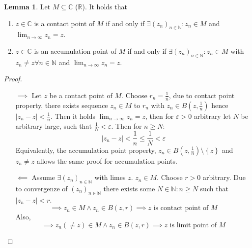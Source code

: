\documentclass[a4paper,landscape,twocolumn]{article}
\theoremstyle{definition}
\newtheorem{lemma}{Lemma}
\newcommand\set[1]{\left\{#1\right\}}
\newcommand\abs[1]{\left|#1\right|}
\newcommand\seq[1]{{\left(#1\right)}_{n \in \mathbb N}}
\begin{document}
\begin{lemma}
  \label{characterization-limit-contact-points}
  Let $M \subseteq \mathbb C$ ($\mathbb R$). It holds that
  \begin{enumerate}
    \item $z \in \mathbb C$ is a contact point of $M$
      if and only if $\exists (z_n)_{n \in \mathbb N}: z_n \in M$ and $\lim_{n\to\infty} z_n = z$.
    \item $z \in \mathbb C$ is an accumulation point of $M$
      if and only if $\exists (z_n)_{n \in \mathbb N}: z_n \in M$ with $z_n \neq z \forall n \in \mathbb N$
      and $\lim_{n\to\infty} z_n = z$.
  \end{enumerate}

\end{lemma}
\begin{proof}
  \begin{itemize}
    \item[$\implies$]
      Let $z$ be a contact point of $M$. Choose $r_n = \frac1n$, due to contact point property,
      there exists sequence $z_n \in M$ to $r_n$ with $z_n \in B(z, \frac1n)$ hence $\abs{z_n - z} < \frac1n$.
      Then it holds $\lim_{n\to\infty} z_n = z$, then for $\varepsilon > 0$ arbitrary let $N$ be arbitrary large,
      such that $\frac1N < \varepsilon$. Then for $n \geq N$:
      \[ \abs{z_n - z} < \frac1n \leq \frac1N < \varepsilon \]
      Equivalently, the accumulation point property, $z_n \in B(z, \frac1n) \setminus \set{z}$ and $z_n \neq z$
      allows the same proof for accumulation points.
    \item[$\impliedby$] Assume $\exists \seq{z_n}$ with limes $z$. $z_n \in M$.
      Choose $r > 0$ arbitrary. Due to convergenze of $\seq{z_n}$ there exists some
      $N \in \mathbb N: n \geq N$ such that $\abs{z_n - z} < r$.
      \[ \implies z_n \in M \land z_n \in B(z, r) \implies z \text{ is contact point of $M$} \]
      Also,
      \[ \implies z_n (\neq z) \in M \land z_n \in B(z, r) \implies z \text{ is limit point of $M$} \]
  \end{itemize}
\end{proof}
\end{document}
